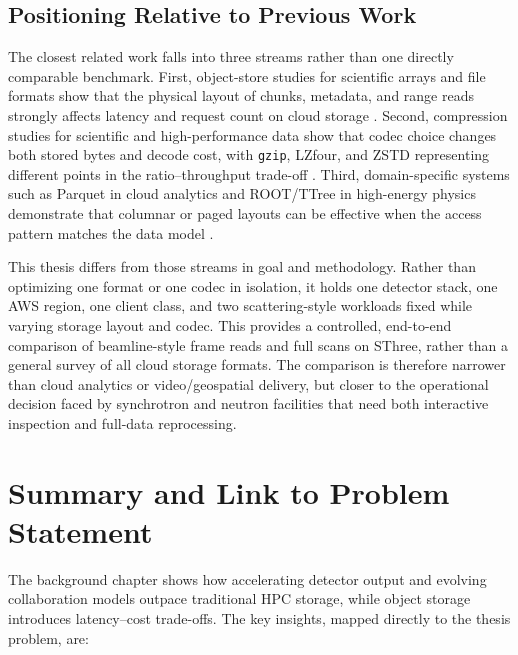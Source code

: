 \documentclass[nomenclature, english, bibtex]{kththesis}
\numberwithin{listing}{chapter}
\begin{document}
\subsection{Positioning Relative to Previous Work}
\label{sec:related-work-positioning}
The closest related work falls into three streams rather than one directly comparable benchmark. First, object-store studies for scientific arrays and file formats show that the physical layout of chunks, metadata, and range reads strongly affects latency and request count on cloud storage \cite{durbin2020cloud,kang2020predicting,moore2023ome,readey2020hsds}. Second, compression studies for scientific and high-performance data show that codec choice changes both stored bytes and decode cost, with \texttt{gzip}, \gls{LZfour}, and \gls{ZSTD} representing different points in the ratio--throughput trade-off \cite{almeida2014two,delaunay2019evaluation,chen2023fcbench}. Third, domain-specific systems such as Parquet in cloud analytics and \gls{ROOT}/\gls{TTree} in high-energy physics demonstrate that columnar or paged layouts can be effective when the access pattern matches the data model \cite{ivanov2020impact,abs-2107-07304}.

This thesis differs from those streams in goal and methodology. Rather than optimizing one format or one codec in isolation, it holds one detector stack, one \gls{AWS} region, one client class, and two scattering-style workloads fixed while varying storage layout and codec. This provides a controlled, end-to-end comparison of beamline-style frame reads and full scans on \gls{SThree}, rather than a general survey of all cloud storage formats. The comparison is therefore narrower than cloud analytics or video/geospatial delivery, but closer to the operational decision faced by synchrotron and neutron facilities that need both interactive inspection and full-data reprocessing.


\section{Summary and Link to Problem Statement}
\label{sec:summary-problem-statement}

The background chapter shows how accelerating detector output and evolving collaboration models outpace traditional \gls{HPC} storage, while object storage introduces latency–cost trade-offs. The key insights, mapped directly to the thesis problem, are:
\end{document}
